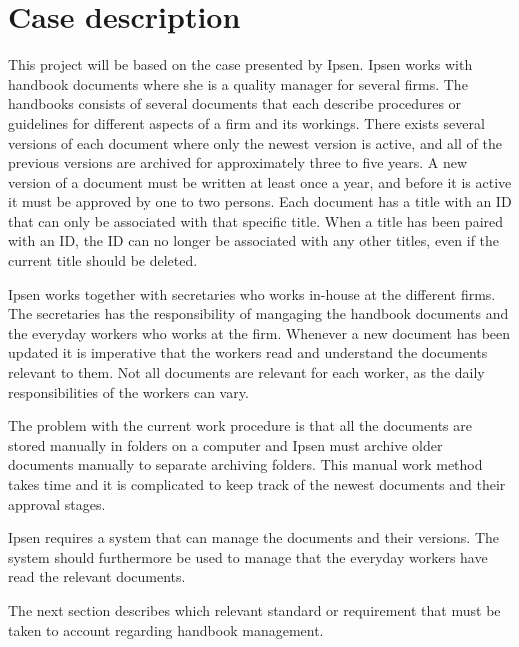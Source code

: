 \section{Case description} \label{case}

This project will be based on the case presented by Ipsen.
Ipsen works with handbook documents where she is a quality manager for several firms.
The handbooks consists of several documents that each describe procedures or guidelines for different aspects of a firm and its workings.
There exists several versions of each document where only the newest version is active, and all of the previous versions are archived for approximately three to five years.
A new version of a document must be written at least once a year, and before it is active it must be approved by one to two persons.
Each document has a title with an ID that can only be associated with that specific title. 
When a title has been paired with an ID, the ID can no longer be associated with any other titles, even if the current title should be deleted.

Ipsen works together with secretaries who works in-house at the different firms.
The secretaries has the responsibility of mangaging the handbook documents and the everyday workers who works at the firm.
Whenever a new document has been updated it is imperative that the workers read and understand the documents relevant to them.
Not all documents are relevant for each worker, as the daily responsibilities of the workers can vary.

The problem with the current work procedure is that all the documents are stored manually in folders on a computer and Ipsen must archive older documents manually to separate archiving folders.
This manual work method takes time and it is complicated to keep track of the newest documents and their approval stages.

Ipsen requires a system that can manage the documents and their versions.
The system should furthermore be used to manage that the everyday workers have read the relevant documents. 

The next section describes which relevant standard or requirement that must be taken to account regarding handbook management. 
